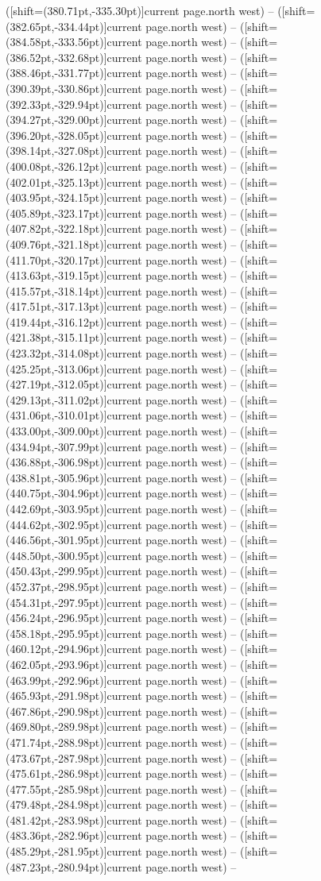 \documentclass[11pt]{article}
\begin{document}
([shift={(380.71pt,-335.30pt)}]current page.north west) -- ([shift={(382.65pt,-334.44pt)}]current page.north west) -- ([shift={(384.58pt,-333.56pt)}]current page.north west) -- ([shift={(386.52pt,-332.68pt)}]current page.north west) -- ([shift={(388.46pt,-331.77pt)}]current page.north west) -- ([shift={(390.39pt,-330.86pt)}]current page.north west) -- ([shift={(392.33pt,-329.94pt)}]current page.north west) -- ([shift={(394.27pt,-329.00pt)}]current page.north west) -- ([shift={(396.20pt,-328.05pt)}]current page.north west) -- ([shift={(398.14pt,-327.08pt)}]current page.north west) -- ([shift={(400.08pt,-326.12pt)}]current page.north west) -- ([shift={(402.01pt,-325.13pt)}]current page.north west) -- ([shift={(403.95pt,-324.15pt)}]current page.north west) -- ([shift={(405.89pt,-323.17pt)}]current page.north west) -- ([shift={(407.82pt,-322.18pt)}]current page.north west) -- ([shift={(409.76pt,-321.18pt)}]current page.north west) -- ([shift={(411.70pt,-320.17pt)}]current page.north west) -- ([shift={(413.63pt,-319.15pt)}]current page.north west) -- ([shift={(415.57pt,-318.14pt)}]current page.north west) -- ([shift={(417.51pt,-317.13pt)}]current page.north west) -- ([shift={(419.44pt,-316.12pt)}]current page.north west) -- ([shift={(421.38pt,-315.11pt)}]current page.north west) -- ([shift={(423.32pt,-314.08pt)}]current page.north west) -- ([shift={(425.25pt,-313.06pt)}]current page.north west) -- ([shift={(427.19pt,-312.05pt)}]current page.north west) -- ([shift={(429.13pt,-311.02pt)}]current page.north west) -- ([shift={(431.06pt,-310.01pt)}]current page.north west) -- ([shift={(433.00pt,-309.00pt)}]current page.north west) -- ([shift={(434.94pt,-307.99pt)}]current page.north west) -- ([shift={(436.88pt,-306.98pt)}]current page.north west) -- ([shift={(438.81pt,-305.96pt)}]current page.north west) -- ([shift={(440.75pt,-304.96pt)}]current page.north west) -- ([shift={(442.69pt,-303.95pt)}]current page.north west) -- ([shift={(444.62pt,-302.95pt)}]current page.north west) -- ([shift={(446.56pt,-301.95pt)}]current page.north west) -- ([shift={(448.50pt,-300.95pt)}]current page.north west) -- ([shift={(450.43pt,-299.95pt)}]current page.north west) -- ([shift={(452.37pt,-298.95pt)}]current page.north west) -- ([shift={(454.31pt,-297.95pt)}]current page.north west) -- ([shift={(456.24pt,-296.95pt)}]current page.north west) -- ([shift={(458.18pt,-295.95pt)}]current page.north west) -- ([shift={(460.12pt,-294.96pt)}]current page.north west) -- ([shift={(462.05pt,-293.96pt)}]current page.north west) -- ([shift={(463.99pt,-292.96pt)}]current page.north west) -- ([shift={(465.93pt,-291.98pt)}]current page.north west) -- ([shift={(467.86pt,-290.98pt)}]current page.north west) -- ([shift={(469.80pt,-289.98pt)}]current page.north west) -- ([shift={(471.74pt,-288.98pt)}]current page.north west) -- ([shift={(473.67pt,-287.98pt)}]current page.north west) -- ([shift={(475.61pt,-286.98pt)}]current page.north west) -- ([shift={(477.55pt,-285.98pt)}]current page.north west) -- ([shift={(479.48pt,-284.98pt)}]current page.north west) -- ([shift={(481.42pt,-283.98pt)}]current page.north west) -- ([shift={(483.36pt,-282.96pt)}]current page.north west) -- ([shift={(485.29pt,-281.95pt)}]current page.north west) -- ([shift={(487.23pt,-280.94pt)}]current page.north west) -- 
\end{document}
